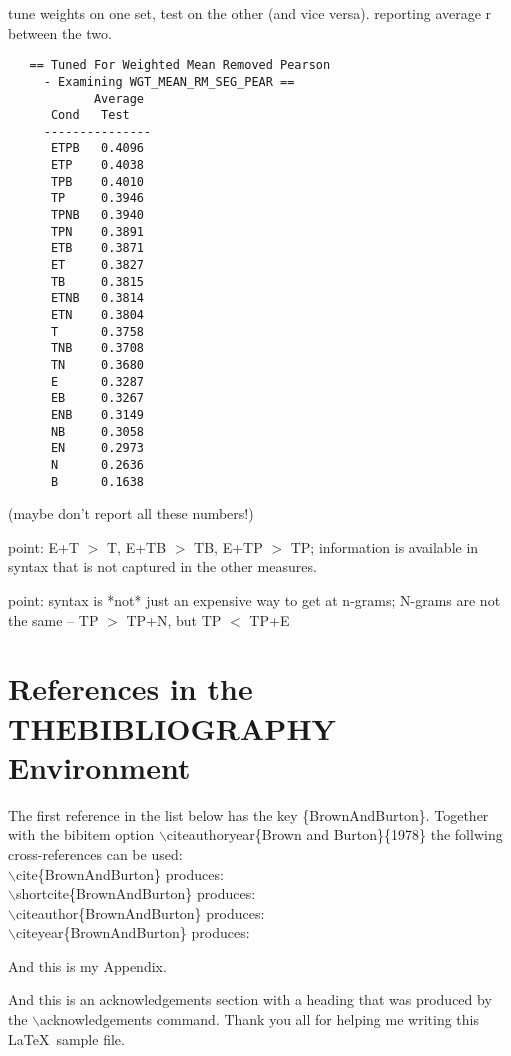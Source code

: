 \documentclass{kluwer}    %
\begin{document}
\begin{article}
tune weights on one set, test on the other (and vice versa).
reporting average r between the two.

\begin{verbatim}
   == Tuned For Weighted Mean Removed Pearson
     - Examining WGT_MEAN_RM_SEG_PEAR ==
            Average
      Cond   Test  
     ---------------
      ETPB   0.4096
      ETP    0.4038
      TPB    0.4010
      TP     0.3946
      TPNB   0.3940
      TPN    0.3891
      ETB    0.3871
      ET     0.3827
      TB     0.3815
      ETNB   0.3814
      ETN    0.3804
      T      0.3758
      TNB    0.3708
      TN     0.3680
      E      0.3287
      EB     0.3267
      ENB    0.3149
      NB     0.3058
      EN     0.2973
      N      0.2636
      B      0.1638
\end{verbatim}
(maybe don't report all these numbers!)
  
point: E+T $>$ T, E+TB $>$ TB, E+TP $>$ TP; information is available in
syntax that is not captured in the other measures.

point: syntax is *not* just an expensive way to get at n-grams;
N-grams are not the same -- TP $>$ TP+N, but TP $<$ TP+E

      

\section{References in the THEBIBLIOGRAPHY Environment}
The first reference in the list below has the key \{BrownAndBurton\}.
Together with the bibitem option $\backslash$citeauthoryear\{Brown and
Burton\}\{1978\} the follwing cross-references can be used:\\
$\backslash$cite\{BrownAndBurton\} produces: \cite{BrownAndBurton}\\
$\backslash$shortcite\{BrownAndBurton\}  produces: \\  
$\backslash$citeauthor\{BrownAndBurton\}  produces: \citeauthor{BrownAndBurton}\\  
$\backslash$citeyear\{BrownAndBurton\}  produces: \citeyear{BrownAndBurton}\\  


\appendix

And this is my Appendix.


\acknowledgements
And this is an acknowledgements section with a heading that was produced by the
$\backslash$acknowledgements command. Thank you all for helping me writing this
\LaTeX\ sample file.


\end{article}
\end{document}
